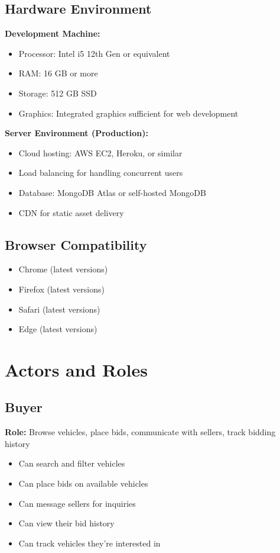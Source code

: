 \subsection{Hardware Environment}

\textbf{Development Machine:}
\begin{itemize}
    \item Processor: Intel i5 12th Gen or equivalent
    \item RAM: 16 GB or more
    \item Storage: 512 GB SSD
    \item Graphics: Integrated graphics sufficient for web development
\end{itemize}

\textbf{Server Environment (Production):}
\begin{itemize}
    \item Cloud hosting: AWS EC2, Heroku, or similar
    \item Load balancing for handling concurrent users
    \item Database: MongoDB Atlas or self-hosted MongoDB
    \item CDN for static asset delivery
\end{itemize}

\subsection{Browser Compatibility}
\begin{itemize}
    \item Chrome (latest versions)
    \item Firefox (latest versions)
    \item Safari (latest versions)
    \item Edge (latest versions)
\end{itemize}

\section{Actors and Roles}

\subsection{Buyer}
\textbf{Role:} Browse vehicles, place bids, communicate with sellers, track bidding history
\begin{itemize}
    \item Can search and filter vehicles
    \item Can place bids on available vehicles
    \item Can message sellers for inquiries
    \item Can view their bid history
    \item Can track vehicles they're interested in
\end{itemize}

